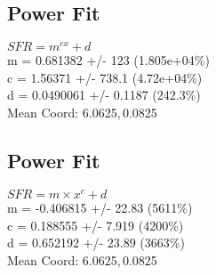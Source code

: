 \documentclass{article}
\begin{document}
		\subsection{Power Fit}
		\begin{minipage}[h]{0.6\textwidth}
				\begin{center}
					\begingroup{}
		  			\resizebox{\textwidth}{!}{%
						
		  			}\endgroup
				\end{center}
		\end{minipage}
		\begin{minipage}[h]{0.35\textwidth}
			$SFR = m^{c x} + d$ \\
			m               = 0.681382         +/- 123          (1.805e+04\%) \\
			c               = 1.56371          +/- 738.1        (4.72e+04\%) \\
			d               = 0.0490061        +/- 0.1187       (242.3\%) \\

			Mean Coord: 6.0625,\,0.0825
		\end{minipage}

		\subsection{Power Fit}
		\begin{minipage}[h]{0.6\textwidth}
				\begin{center}
					\begingroup{}
		  			\resizebox{\textwidth}{!}{%
						
		  			}\endgroup
				\end{center}
		\end{minipage}
		\begin{minipage}[h]{0.35\textwidth}
			$SFR = m\times x^{c} + d$ \\
			m               = -0.406815        +/- 22.83        (5611\%) \\
			c               = 0.188555         +/- 7.919        (4200\%) \\
			d               = 0.652192         +/- 23.89        (3663\%) \\

			Mean Coord: 6.0625,\,0.0825
		\end{minipage}
\end{document}

